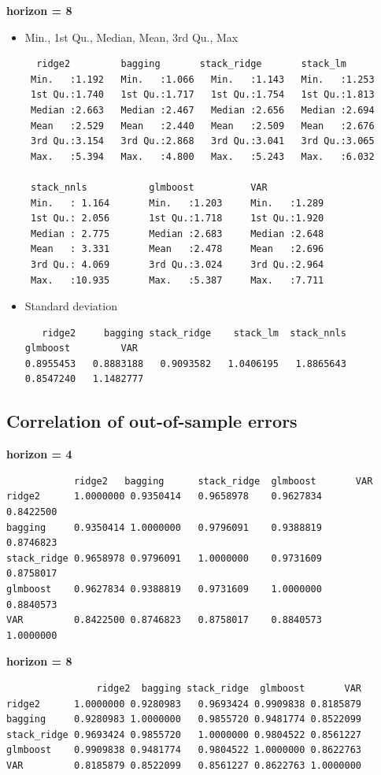 \textbf{horizon = 8}

\begin{itemize}

\item Min., 1st Qu., Median, Mean, 3rd Qu., Max

\begin{verbatim}
  ridge2         bagging       stack_ridge       stack_lm               
 Min.   :1.192   Min.   :1.066   Min.   :1.143   Min.   :1.253      
 1st Qu.:1.740   1st Qu.:1.717   1st Qu.:1.754   1st Qu.:1.813      
 Median :2.663   Median :2.467   Median :2.656   Median :2.694      
 Mean   :2.529   Mean   :2.440   Mean   :2.509   Mean   :2.676      
 3rd Qu.:3.154   3rd Qu.:2.868   3rd Qu.:3.041   3rd Qu.:3.065      
 Max.   :5.394   Max.   :4.800   Max.   :5.243   Max.   :6.032      
 
 stack_nnls           glmboost          VAR
 Min.   : 1.164       Min.   :1.203     Min.   :1.289
 1st Qu.: 2.056       1st Qu.:1.718     1st Qu.:1.920
 Median : 2.775       Median :2.683     Median :2.648 
 Mean   : 3.331       Mean   :2.478     Mean   :2.696 
 3rd Qu.: 4.069       3rd Qu.:3.024     3rd Qu.:2.964
 Max.   :10.935       Max.   :5.387     Max.   :7.711
\end{verbatim}

\item Standard deviation

\begin{verbatim}
   ridge2     bagging stack_ridge    stack_lm  stack_nnls    glmboost         VAR
0.8955453   0.8883188   0.9093582   1.0406195   1.8865643   0.8547240   1.1482777 
\end{verbatim}

\end{itemize}

\subsection{Correlation of out-of-sample errors}
\label{oos_errors_cor}

\textbf{horizon = 4}

\begin{verbatim}
            ridge2   bagging      stack_ridge  glmboost       VAR
ridge2      1.0000000 0.9350414   0.9658978    0.9627834      0.8422500
bagging     0.9350414 1.0000000   0.9796091    0.9388819      0.8746823
stack_ridge 0.9658978 0.9796091   1.0000000    0.9731609      0.8758017
glmboost    0.9627834 0.9388819   0.9731609    1.0000000      0.8840573
VAR         0.8422500 0.8746823   0.8758017    0.8840573      1.0000000
\end{verbatim}

\textbf{horizon = 8}

\begin{verbatim}
                ridge2  bagging stack_ridge  glmboost       VAR
ridge2      1.0000000 0.9280983   0.9693424 0.9909838 0.8185879
bagging     0.9280983 1.0000000   0.9855720 0.9481774 0.8522099
stack_ridge 0.9693424 0.9855720   1.0000000 0.9804522 0.8561227
glmboost    0.9909838 0.9481774   0.9804522 1.0000000 0.8622763
VAR         0.8185879 0.8522099   0.8561227 0.8622763 1.0000000
\end{verbatim}